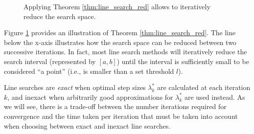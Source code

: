 \begin{figure}[H]
	\caption{Applying Theorem \ref{thm:line_search_red} allows to iteratively reduce the search space.}\label{fig:line_search_reduction}
\end{figure}

Figure \ref{fig:line_search_reduction} provides an illustration of Theorem \ref{thm:line_search_red}. The line below the x-axis illustrates how the search space can be reduced between two successive iterations. In fact, most line search methods will iteratively reduce the search interval (represented by $[a,b]$) until the interval is sufficiently small to be considered ``a point'' (i.e., is smaller than a set threshold $l$).

Line searches are \emph{exact} when optimal step sizes $\lambda_k^*$ are calculated at each iteration $k$, and inexact when arbitrarily good approximations for $\lambda_k^*$ are used instead. As we will see, there is a trade-off between the number iterations required for convergence and the time taken per iteration that must be taken into account when choosing between exact and inexact line searches.

